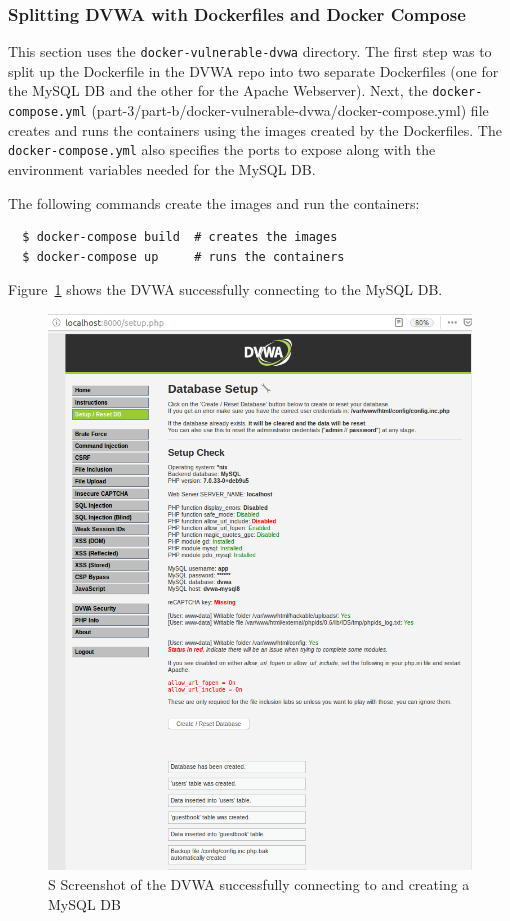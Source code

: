 \documentclass[11pt]{article}
\begin{document}
\subsubsection*{Splitting DVWA with Dockerfiles and Docker Compose}\label{docker-compose-dvwa}
This section uses the \verb|docker-vulnerable-dvwa| directory.
The first step was to split up the Dockerfile in the DVWA repo into two separate Dockerfiles (one for the MySQL DB and the other for the Apache Webserver).
Next, the \verb|docker-compose.yml| (part-3/part-b/docker-vulnerable-dvwa/docker-compose.yml) file creates and runs the containers using the images created by the Dockerfiles.
The \verb|docker-compose.yml| also specifies the ports to expose along with the environment variables needed for the MySQL DB.

\noindent The following commands create the images and run the containers:
\begin{verbatim}
  $ docker-compose build  # creates the images
  $ docker-compose up     # runs the containers
\end{verbatim}
Figure~\ref{fig:docker-compose-dvwa} shows the DVWA successfully connecting to the MySQL DB.
\begin{figure}[htbp]
  \centering
  \includegraphics[width=.9\linewidth]{./docker-compose-dvwa.png}
  \caption{\label{fig:docker-compose-dvwa}S
  Screenshot of the DVWA successfully connecting to and creating a MySQL DB}
\end{figure}
\end{document}
